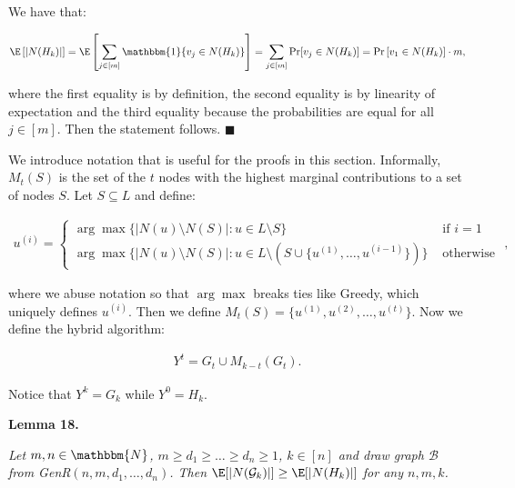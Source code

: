 We have that:\par


\[\begin{gathered}
\displaystyle\E\left[|N(H_{k})|\right]=\E\left[\sum_{j\in[m]}{\mathbbm{1}\{v_{j}\in N(H_{k})\}}\right]=\sum_{j\in[m]}{\Pr[v_{j}\in N(H_{k})]}=\Pr\left[v_{1}\in N(H_{k})\right]\cdot m,
\end{gathered}\]


where the first equality is by definition, the second equality is by linearity of expectation and the third equality because the probabilities are equal for all $j\in[m]$. Then the statement follows.
\ensuremath{\blacksquare}\par





We introduce notation that is useful for the proofs in this section.
Informally, $M_{t}(S)$ is the set of the $t$ nodes with the highest marginal contributions to a set of nodes $S$.
Let $S\subseteq L$ and define:\par


\[\begin{gathered}
\displaystyle u^{(i)}=\begin{cases}\arg\max\{|N(u)\setminus N(S)|:u\in L\setminus S\}&\text{ if }i=1\\
\arg\max\{|N(u)\setminus N(S)|:u\in L\setminus\left(S\cup\{u^{(1)},\dots,u^{(i-1)}\}\right)\}&\text{ otherwise }\end{cases},
\end{gathered}\]


where we abuse notation so that $\arg\max$ breaks ties like Greedy, which uniquely defines $u^{(i)}$.
Then we define $M_{t}(S)=\{u^{(1)},u^{(2)},\dots,u^{(t)}\}$.
Now we define the hybrid algorithm:\par


\[\begin{gathered}
\displaystyle Y^{t}=G_{t}\cup M_{k-t}(G_{t}).
\end{gathered}\]


Notice that $Y^{k}=G_{k}$ while $Y^{0}=H_{k}$.\par





\par\medskip\noindent\textbf{\textbf{Lemma 18}\textbf{.}}\par



\emph{Let $m,n\in\mathbbm{N}$, $m\geq d_{1}\geq\dots\geq d_{n}\geq 1$, $k\in[n]$ and draw graph $\mathcal{B}$ from GenR$(n,m,d_{1},\dots,d_{n})$. Then $\E[|N(\mathcal{G}_{k})|]\geq\E[|N(H_{k})|]$ for any $n,m,k$.}\par



